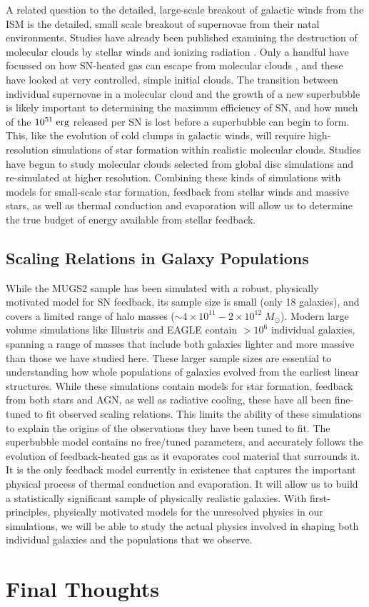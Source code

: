 A related question to the detailed, large-scale breakout of galactic winds from
the ISM is the detailed, small scale breakout of supernovae from their natal
environments.  Studies have already been published examining the destruction of
molecular clouds by stellar winds and ionizing radiation
\citep{Murray2010,Walch2012}.  Only a handful have focussed on how SN-heated gas
can escape from molecular clouds \citep{Rogers2013}, and these have looked at
very controlled, simple initial clouds.  The transition between individual
supernovae in a molecular cloud and the growth of a new superbubble is likely
important to determining the maximum efficiency of SN, and how much 
of the $10^{51}\;\rm{erg}$ released per SN is lost before a superbubble can begin
to form.  This, like the evolution of cold clumps in galactic winds, will
require high-resolution simulations of star formation within realistic molecular
clouds.  Studies have begun \citep{Dobbs2015} to study molecular clouds selected
from global disc simulations and re-simulated at higher resolution.  Combining
these kinds of simulations with models for small-scale star formation, feedback
from stellar winds and massive stars, as well as thermal conduction and
evaporation will allow us to determine the true budget of energy available from
stellar feedback.

\subsection{Scaling Relations in Galaxy Populations}
While the MUGS2 sample has been simulated with a robust, physically motivated
model for SN feedback, its sample size is small (only 18 galaxies), and covers a
limited range of halo masses ($\sim 4\times10^{11}-2\times10^{12}\;M_\odot$).
Modern large volume simulations like Illustris \citep{Vogelsberger2014b} and
EAGLE \citep{Schaye2015} contain $>10^6$ individual galaxies, spanning a range
of masses that include both galaxies lighter and more massive than those we have
studied here.  These larger sample sizes are essential to understanding how
whole populations of galaxies evolved from the earliest linear structures.
While these simulations contain models for star formation, feedback from both
stars and AGN, as well as radiative cooling, these have all been fine-tuned to
fit observed scaling relations.  This limits the ability of these simulations to
explain the origins of the observations they have been tuned to fit.  The
superbubble model contains no free/tuned parameters, and accurately follows the
evolution of feedback-heated gas as it evaporates cool material that surrounds
it.  It is the only feedback model currently in existence that captures the
important physical process of thermal conduction and evaporation.  It will allow
us to build a statistically significant sample of physically realistic galaxies.
With first-principles, physically motivated models for the unresolved physics in
our simulations, we will be able to study the actual physics involved in shaping
both individual galaxies and the populations that we observe. 

\section{Final Thoughts}


